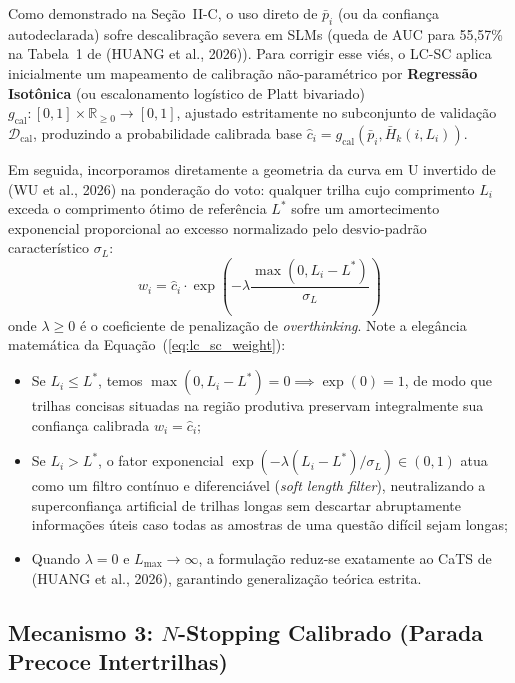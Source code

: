\documentclass[9pt,conference]{IEEEtran}
\begin{document}
Como demonstrado na Se\c{c}\~{a}o~II-C, o uso direto de $\bar{p}_i$ (ou da confian\c{c}a autodeclarada) sofre descalibra\c{c}\~{a}o severa em SLMs (queda de AUC para 55,57\% na Tabela~1 de (HUANG et al., 2026)). Para corrigir esse vi\'{e}s, o LC-SC aplica inicialmente um mapeamento de calibra\c{c}\~{a}o n\~{a}o-param\'{e}trico por \textbf{Regress\~{a}o Isot\^{o}nica} (ou escalonamento log\'{i}stico de Platt bivariado) $g_{\text{cal}}: [0, 1] \times \mathbb{R}_{\ge 0} \to [0, 1]$, ajustado estritamente no subconjunto de valida\c{c}\~{a}o $\mathcal{D}_{\text{cal}}$, produzindo a probabilidade calibrada base $\hat{c}_i = g_{\text{cal}}(\bar{p}_i, \bar{H}_k(i, L_i))$.

Em seguida, incorporamos diretamente a geometria da curva em U invertido de (WU et al., 2026) na pondera\c{c}\~{a}o do voto: qualquer trilha cujo comprimento $L_i$ exceda o comprimento \'{o}timo de refer\^{e}ncia $L^*$ sofre um amortecimento exponencial proporcional ao excesso normalizado pelo desvio-padr\~{a}o caracter\'{i}stico $\sigma_L$:
\begin{equation}
w_i = \hat{c}_i \cdot \exp\left( -\lambda \frac{\max\left(0, L_i - L^*\right)}{\sigma_L} \right)
\label{eq:lc_sc_weight}
\end{equation}
onde $\lambda \ge 0$ \'{e} o coeficiente de penaliza\c{c}\~{a}o de \textit{overthinking}. Note a eleg\^{a}ncia matem\'{a}tica da Equa\c{c}\~{a}o~(\ref{eq:lc_sc_weight}):
\begin{itemize}
    \item Se $L_i \le L^*$, temos $\max(0, L_i - L^*) = 0 \implies \exp(0) = 1$, de modo que trilhas concisas situadas na regi\~{a}o produtiva preservam integralmente sua confian\c{c}a calibrada $w_i = \hat{c}_i$;
    \item Se $L_i > L^*$, o fator exponencial $\exp(-\lambda(L_i - L^*)/\sigma_L) \in (0, 1)$ atua como um filtro cont\'{i}nuo e diferenci\'{a}vel (\textit{soft length filter}), neutralizando a superconfian\c{c}a artificial de trilhas longas sem descartar abruptamente informa\c{c}\~{o}es \'{u}teis caso todas as amostras de uma quest\~{a}o dif\'{i}cil sejam longas;
    \item Quando $\lambda = 0$ e $L_{\max} \to \infty$, a formula\c{c}\~{a}o reduz-se exatamente ao CaTS de (HUANG et al., 2026), garantindo generaliza\c{c}\~{a}o te\'{o}rica estrita.
\end{itemize}

\subsection{Mecanismo 3: $N$-Stopping Calibrado (Parada Precoce Intertrilhas)}
\end{document}
